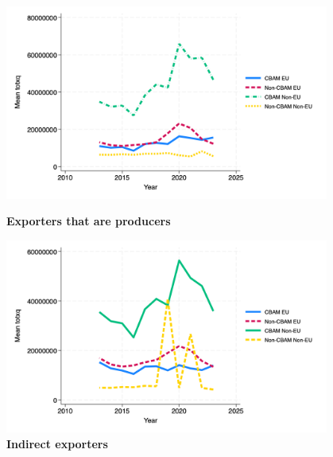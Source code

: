 \documentclass{article}
\begin{document}
\begin{figure}[H]
\centering
\includegraphics[width=0.95\textwidth]{totxq_ep.png}
\caption{\textbf{Exporters that are producers}}
\includegraphics[width=0.95\textwidth]{totxq_indir.png}
\caption{\textbf{Indirect exporters}}
\end{figure}
\end{document}
